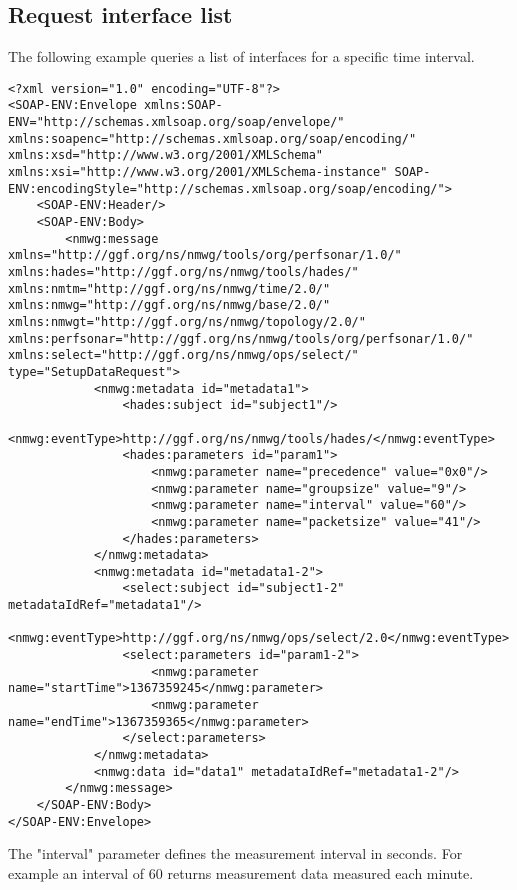 \documentclass[a4paper,12pt,titlepage,hidelinks,fleqn]{article}
\begin{document}
\subsection{Request interface list}
\begin{flushleft}
The following example queries a list of interfaces for a specific time interval.
\begin{framed}
\begin{lstlisting}
<?xml version="1.0" encoding="UTF-8"?>
<SOAP-ENV:Envelope xmlns:SOAP-ENV="http://schemas.xmlsoap.org/soap/envelope/" xmlns:soapenc="http://schemas.xmlsoap.org/soap/encoding/" xmlns:xsd="http://www.w3.org/2001/XMLSchema" xmlns:xsi="http://www.w3.org/2001/XMLSchema-instance" SOAP-ENV:encodingStyle="http://schemas.xmlsoap.org/soap/encoding/">
	<SOAP-ENV:Header/>
	<SOAP-ENV:Body>
		<nmwg:message xmlns="http://ggf.org/ns/nmwg/tools/org/perfsonar/1.0/" xmlns:hades="http://ggf.org/ns/nmwg/tools/hades/" xmlns:nmtm="http://ggf.org/ns/nmwg/time/2.0/" xmlns:nmwg="http://ggf.org/ns/nmwg/base/2.0/" xmlns:nmwgt="http://ggf.org/ns/nmwg/topology/2.0/" xmlns:perfsonar="http://ggf.org/ns/nmwg/tools/org/perfsonar/1.0/" xmlns:select="http://ggf.org/ns/nmwg/ops/select/" type="SetupDataRequest">
			<nmwg:metadata id="metadata1">
				<hades:subject id="subject1"/>
				<nmwg:eventType>http://ggf.org/ns/nmwg/tools/hades/</nmwg:eventType>
				<hades:parameters id="param1">
					<nmwg:parameter name="precedence" value="0x0"/>
					<nmwg:parameter name="groupsize" value="9"/>
					<nmwg:parameter name="interval" value="60"/>
					<nmwg:parameter name="packetsize" value="41"/>
				</hades:parameters>
			</nmwg:metadata>
			<nmwg:metadata id="metadata1-2">
				<select:subject id="subject1-2" metadataIdRef="metadata1"/>
				<nmwg:eventType>http://ggf.org/ns/nmwg/ops/select/2.0</nmwg:eventType>
				<select:parameters id="param1-2">
					<nmwg:parameter name="startTime">1367359245</nmwg:parameter>
					<nmwg:parameter name="endTime">1367359365</nmwg:parameter>
				</select:parameters>
			</nmwg:metadata>
			<nmwg:data id="data1" metadataIdRef="metadata1-2"/>
		</nmwg:message>
	</SOAP-ENV:Body>
</SOAP-ENV:Envelope>
\end{lstlisting}
\end{framed}
The "interval" parameter defines the measurement interval in seconds. For example an interval of 60 returns measurement data measured each minute.
\end{flushleft}
\end{document}
